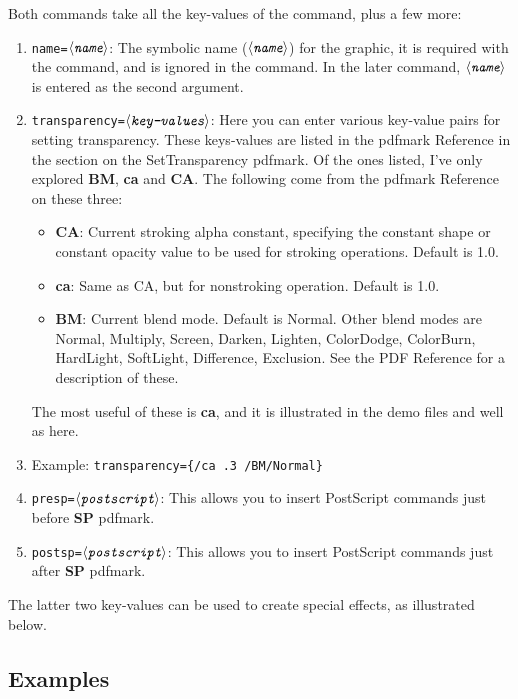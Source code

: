 \documentclass{article}
\def\anglemeta#1{$\langle\textit{\texttt{#1}}\rangle$}
\def\meta#1{\textit{\texttt{#1}}}
\let\meta\anglemeta
\begin{document}
\KVP Both commands take all the key-values of the  command, plus
a few more:
\begin{enumerate}
    \item \texttt{name=\meta{name}}: The symbolic name (\meta{name}) for
        the graphic, it is required with the  command,
        and is ignored in the  command. In the later command,
        \meta{name} is entered as the second argument.

    \item \texttt{transparency=\meta{key-values}}: Here you can enter
    various key-value pairs for setting transparency. These
    keys-values are listed in the pdfmark Reference in the section
    on the SetTransparency pdfmark. Of the ones listed, I've only explored
    \textbf{BM}, \textbf{ca} and \textbf{CA}. The following come from the pdfmark Reference on these three:
    \begin{itemize}
        \item \textbf{CA}: Current stroking alpha constant,
        specifying the constant shape or constant opacity value to
        be used for stroking operations. Default is 1.0.
        \item \textbf{ca}: Same as CA, but for nonstroking operation. Default is 1.0.
        \item \textbf{BM}: Current blend mode. Default is Normal.
            Other blend modes are Normal, Multiply, Screen,
            Darken, Lighten, ColorDodge, ColorBurn, HardLight,
            SoftLight, Difference, Exclusion. See the PDF
            Reference for a description of these.

    \end{itemize}
    The most useful of these is \textbf{ca}, and it is illustrated
    in the demo files and well as here.

    \item[] Example: \verb!transparency={/ca .3 /BM/Normal}!

    \item \texttt{presp=\meta{postscript}}: This allows you to insert
        PostScript commands just before \textbf{SP} pdfmark.
    \item \texttt{postsp=\meta{postscript}}: This allows you to insert
        PostScript commands just after \textbf{SP} pdfmark.
\end{enumerate}
The latter two key-values can be used to create special effects, as illustrated below.

\subsection{Examples}
\end{document}
